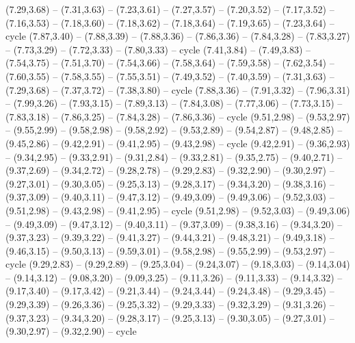 \expandafter\def\csname geo:gebiet:JOR\endcsname{
  (7.29,3.68) -- (7.31,3.63) -- (7.23,3.61) -- (7.27,3.57) -- (7.20,3.52) -- (7.17,3.52) -- (7.16,3.53) -- (7.18,3.60) -- (7.18,3.62) -- (7.18,3.64) -- (7.19,3.65) -- (7.23,3.64) -- cycle}
\expandafter\def\csname geo:gebiet:ARE\endcsname{
  (7.87,3.40) -- (7.88,3.39) -- (7.88,3.36) -- (7.86,3.36) -- (7.84,3.28) -- (7.83,3.27) -- (7.73,3.29) -- (7.72,3.33) -- (7.80,3.33) -- cycle}
\expandafter\def\csname geo:gebiet:QAT\endcsname{
  }
\expandafter\def\csname geo:gebiet:KWT\endcsname{
  }
\expandafter\def\csname geo:gebiet:IRQ\endcsname{
  (7.41,3.84) -- (7.49,3.83) -- (7.54,3.75) -- (7.51,3.70) -- (7.54,3.66) -- (7.58,3.64) -- (7.59,3.58) -- (7.62,3.54) -- (7.60,3.55) -- (7.58,3.55) -- (7.55,3.51) -- (7.49,3.52) -- (7.40,3.59) -- (7.31,3.63) -- (7.29,3.68) -- (7.37,3.72) -- (7.38,3.80) -- cycle}
\expandafter\def\csname geo:gebiet:OMN\endcsname{
  (7.88,3.36) -- (7.91,3.32) -- (7.96,3.31) -- (7.99,3.26) -- (7.93,3.15) -- (7.89,3.13) -- (7.84,3.08) -- (7.77,3.06) -- (7.73,3.15) -- (7.83,3.18) -- (7.86,3.25) -- (7.84,3.28) -- (7.86,3.36) -- cycle}
\expandafter\def\csname geo:gebiet:VUT\endcsname{
  }
\expandafter\def\csname geo:gebiet:KHM\endcsname{
  (9.51,2.98) -- (9.53,2.97) -- (9.55,2.99) -- (9.58,2.98) -- (9.58,2.92) -- (9.53,2.89) -- (9.54,2.87) -- (9.48,2.85) -- (9.45,2.86) -- (9.42,2.91) -- (9.41,2.95) -- (9.43,2.98) -- cycle}
\expandafter\def\csname geo:gebiet:THA\endcsname{
  (9.42,2.91) -- (9.36,2.93) -- (9.34,2.95) -- (9.33,2.91) -- (9.31,2.84) -- (9.33,2.81) -- (9.35,2.75) -- (9.40,2.71) -- (9.37,2.69) -- (9.34,2.72) -- (9.28,2.78) -- (9.29,2.83) -- (9.32,2.90) -- (9.30,2.97) -- (9.27,3.01) -- (9.30,3.05) -- (9.25,3.13) -- (9.28,3.17) -- (9.34,3.20) -- (9.38,3.16) -- (9.37,3.09) -- (9.40,3.11) -- (9.47,3.12) -- (9.49,3.09) -- (9.49,3.06) -- (9.52,3.03) -- (9.51,2.98) -- (9.43,2.98) -- (9.41,2.95) -- cycle}
\expandafter\def\csname geo:gebiet:LAO\endcsname{
  (9.51,2.98) -- (9.52,3.03) -- (9.49,3.06) -- (9.49,3.09) -- (9.47,3.12) -- (9.40,3.11) -- (9.37,3.09) -- (9.38,3.16) -- (9.34,3.20) -- (9.37,3.23) -- (9.39,3.22) -- (9.41,3.27) -- (9.44,3.21) -- (9.48,3.21) -- (9.49,3.18) -- (9.46,3.15) -- (9.50,3.13) -- (9.59,3.01) -- (9.58,2.98) -- (9.55,2.99) -- (9.53,2.97) -- cycle}
\expandafter\def\csname geo:gebiet:MMR\endcsname{
  (9.29,2.83) -- (9.29,2.89) -- (9.25,3.04) -- (9.24,3.07) -- (9.18,3.03) -- (9.14,3.04) -- (9.14,3.12) -- (9.08,3.20) -- (9.09,3.25) -- (9.11,3.26) -- (9.11,3.33) -- (9.14,3.32) -- (9.17,3.40) -- (9.17,3.42) -- (9.21,3.44) -- (9.24,3.44) -- (9.24,3.48) -- (9.29,3.45) -- (9.29,3.39) -- (9.26,3.36) -- (9.25,3.32) -- (9.29,3.33) -- (9.32,3.29) -- (9.31,3.26) -- (9.37,3.23) -- (9.34,3.20) -- (9.28,3.17) -- (9.25,3.13) -- (9.30,3.05) -- (9.27,3.01) -- (9.30,2.97) -- (9.32,2.90) -- cycle}
